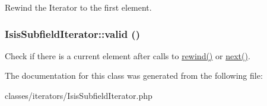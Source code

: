 \label{classIsisSubfieldIterator_a971b36317fab4fc07573f215a118fb40}
Rewind the Iterator to the first element. \hypertarget{classIsisSubfieldIterator_a1934438bfdfa1827e6bcc71d3c90f2db}{
\subsubsection[{valid}]{\setlength{\rightskip}{0pt plus 5cm}IsisSubfieldIterator::valid ()}}
\label{classIsisSubfieldIterator_a1934438bfdfa1827e6bcc71d3c90f2db}
Check if there is a current element after calls to \hyperlink{classIsisSubfieldIterator_a971b36317fab4fc07573f215a118fb40}{rewind()} or \hyperlink{classIsisSubfieldIterator_a74363e3dbfbde6d409b8ba3b70fc9371}{next()}. 

The documentation for this class was generated from the following file:\begin{DoxyCompactItemize}
\item 
classes/iterators/IsisSubfieldIterator.php\end{DoxyCompactItemize}
